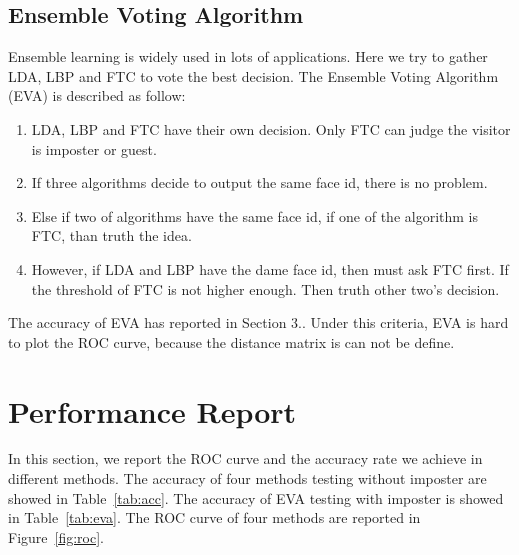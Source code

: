 \documentclass[10pt,twocolumn,letterpaper]{article}
\begin{document}

\subsection{Ensemble Voting Algorithm}
Ensemble learning is widely used in lots of applications. Here we try to 
gather LDA, LBP and FTC to vote the best decision. The Ensemble Voting Algorithm
(EVA) is described
as follow:
\begin{enumerate}
    \item LDA, LBP and FTC have their own decision. Only FTC can judge
          the visitor is imposter or guest.
    \item If three algorithms decide to output the same face id, there is no problem.
    \item Else if two of algorithms have the same face id, if one of the algorithm
          is FTC, than truth the idea.
    \item However, if LDA and LBP have the dame face id, then must ask FTC first.
            If the threshold of FTC is not higher enough. Then truth other two's
            decision.
\end{enumerate}
The accuracy of EVA has reported in Section 3.. Under this criteria, EVA is
hard to plot the ROC curve, because the distance matrix is can not be define.


\section{Performance Report}
In this section, we report the ROC curve and the accuracy rate we achieve
in different methods. The accuracy of four methods testing without imposter
are showed in Table~\ref{tab:acc}. The accuracy of EVA testing with imposter
is showed in Table~\ref{tab:eva}. The ROC curve of four methods are reported
in Figure~\ref{fig:roc}.
\end{document}
